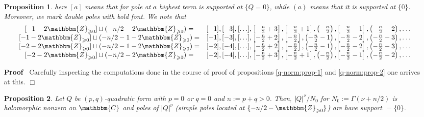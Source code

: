 \documentclass{article}
\newcommand{\assign}{:=}
\newenvironment{proof}{\noindent\textbf{Proof\ }}{\hspace*{\fill}$\Box$\medskip}
\numberwithin{definition}{section}
\numberwithin{lemma}{section}
\newtheorem{proposition}{Proposition}
\numberwithin{proposition}{section}
{\theorembodyfont{\rmfamily}\newtheorem{remark}{Remark}
\numberwithin{remark}{section}
}
\begin{document}
\begin{proposition}
  
  here $[ a]$ means that for pole at $a$ highest term is supported at $\{ Q =
  0 \}$, while $( a)$ means that it is supported at $\{ 0 \}$. Moreover, we
  mark double poles with bold font. We note that
  \[ \begin{array}{cc}
       {}[ - 1 - 2\mathbbm{Z}_{\geqslant 0}] \sqcup ( - n / 2 -
       2\mathbbm{Z}_{\geqslant 0}) = & [ - 1], [ - 3], [ \ldots], \left[ -
       \frac{n}{2} + 3 \right], \left[ - \frac{n}{2} + 1 \right], \left( -
       \frac{n}{2} \right), \left[ - \frac{n}{2} - 1 \right], \left( -
       \frac{n}{2} - 2 \right), \ldots\\
       {}[ - 1 - 2\mathbbm{Z}_{\geqslant 0}] \sqcup ( - n / 2 - 1 -
       2\mathbbm{Z}_{\geqslant 0}) = & [ - 1], [ - 3], [ \ldots], \left[ -
       \frac{n}{2} + 2 \right], \left[ - \frac{n}{2} \right], \left( -
       \frac{n}{2} - 1 \right), \left[ - \frac{n}{2} - 2 \right], \left( -
       \frac{n}{2} - 3 \right), \ldots\\
       {}[ - 2 - 2\mathbbm{Z}_{\geqslant 0}] \sqcup ( - n / 2 - 1 -
       2\mathbbm{Z}_{\geqslant 0}) = & [ - 2], [ - 4], [ \ldots], \left[ -
       \frac{n}{2} + 2 \right], \left[ - \frac{n}{2} \right], \left( -
       \frac{n}{2} - 1 \right), \left[ - \frac{n}{2} - 2 \right], \left( -
       \frac{n}{2} - 3 \right), \ldots\\
       {}[ - 2 - 2\mathbbm{Z}_{\geqslant 0}] \sqcup ( - n / 2 -
       2\mathbbm{Z}_{\geqslant 0}) = & [ - 2], [ - 4], [ \ldots], \left[ -
       \frac{n}{2} + 3 \right], \left[ - \frac{n}{2} + 1 \right], \left( -
       \frac{n}{2} \right), \left[ - \frac{n}{2} - 1 \right], \left( -
       \frac{n}{2} - 2 \right), \ldots
     \end{array} \]
\end{proposition}

\begin{proof}
  Carefully inspecting the computations done in the course of proof of
  propositions \ref{q-norm:prop-1} and \ref{q-norm:prop-2} one arrives at
  this.
\end{proof}

\begin{proposition}
  \label{q-norm:prop-pqzero}Let $Q$ be $( p, q)$-quadratic form with $p = 0$
  or $q = 0$ and $n \assign p + q > 0$. Then, $| Q |^{\nu} / N_0$ for $N_0
  \assign \Gamma ( \nu + n / 2)$ is holomorphic nonzero on $\mathbbm{C}$ and
  poles of $| Q |^{\nu}$ (simple poles located at $\{ - n / 2
  -\mathbbm{Z}_{\geqslant 0} \}$) are have support $= \{ 0 \}$.
\end{proposition}
\end{document}
